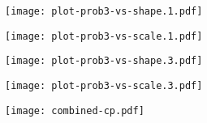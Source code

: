 \documentclass{article}
\begin{document}
\pagestyle{empty}

\noindent
\begin{minipage}[t]{0.45\textwidth}
  \centering
  \texttt{[image: plot-prob3-vs-shape.1.pdf]}
\end{minipage}%
\hspace{0.05\textwidth} %
\begin{minipage}[t]{0.45\textwidth}
  \centering
  \texttt{[image: plot-prob3-vs-scale.1.pdf]}
\end{minipage}

\vspace{0.25mm}

\noindent
\begin{minipage}[t]{0.45\textwidth}
  \centering
  \texttt{[image: plot-prob3-vs-shape.3.pdf]}
\end{minipage}%
\hspace{0.05\textwidth} %
\begin{minipage}[t]{0.45\textwidth}
  \centering
  \texttt{[image: plot-prob3-vs-scale.3.pdf]}
\end{minipage}

\vspace{0.25mm}

\begin{center}
  \texttt{[image: combined-cp.pdf]}
\end{center}
\end{document}
